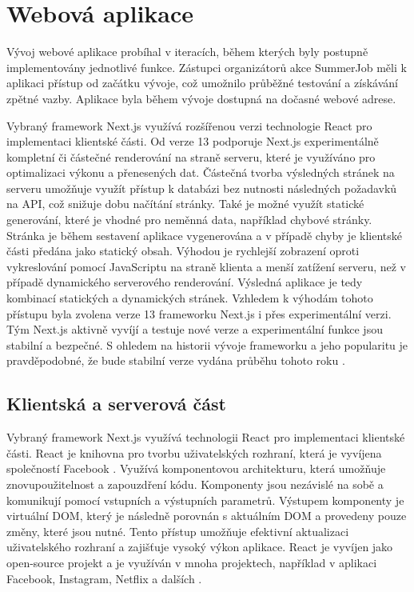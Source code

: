 \section{Webová aplikace}

Vývoj webové aplikace probíhal v iteracích, během kterých byly postupně implementovány jednotlivé funkce. Zástupci organizátorů akce SummerJob
měli k aplikaci přístup od začátku vývoje, což umožnilo průběžné testování a získávání zpětné vazby. Aplikace byla během vývoje dostupná na dočasné webové adrese.

Vybraný framework Next.js využívá rozšířenou verzi technologie React pro implementaci klientské části.
Od verze 13 podporuje Next.js experimentálně kompletní či částečné renderování na straně serveru, které je využíváno pro optimalizaci výkonu a přenesených dat.
Částečná tvorba výsledných stránek na serveru umožňuje využít přístup k databázi bez nutnosti následných požadavků na API, což snižuje dobu načítání stránky.
Také je možné využít statické generování, které je vhodné pro neměnná data, například chybové stránky. Stránka je během sestavení aplikace vygenerována a v případě chyby
je klientské části předána jako statický obsah. Výhodou je rychlejší zobrazení oproti vykreslování pomocí JavaScriptu na straně klienta a menší zatížení serveru, než v případě
dynamického serverového renderování. Výsledná aplikace je tedy kombinací statických a dynamických stránek. Vzhledem k výhodám tohoto přístupu byla zvolena verze 13 frameworku Next.js
i přes experimentální verzi. Tým Next.js aktivně vyvíjí a testuje nové verze a experimentální funkce jsou stabilní a bezpečné. S ohledem na historii
vývoje frameworku a jeho popularitu je pravděpodobné, že bude stabilní verze vydána průběhu tohoto roku \cite{nextjs_versions}.

\subsection{Klientská a serverová část}

Vybraný framework Next.js využívá technologii React pro implementaci klientské části. React je knihovna pro tvorbu uživatelských rozhraní, která je vyvíjena
společností Facebook \cite{react}. Využívá komponentovou architekturu, která umožňuje znovupoužitelnost a zapouzdření kódu. Komponenty jsou nezávislé na sobě a
komunikují pomocí vstupních a výstupních parametrů. Výstupem komponenty je virtuální DOM, který je následně porovnán s aktuálním DOM a provedeny
pouze změny, které jsou nutné. Tento přístup umožňuje efektivní aktualizaci uživatelského rozhraní a zajišťuje vysoký výkon aplikace. React je
vyvíjen jako open-source projekt a je využíván v mnoha projektech, například v aplikaci Facebook, Instagram, Netflix a dalších \cite{react_used}.

